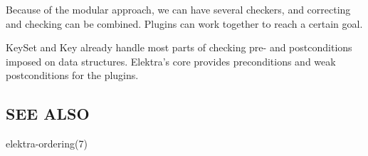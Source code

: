 Because of the modular approach, we can have several checkers, and correcting and checking can be combined. Plugins can work together to reach a certain goal.

{\ttfamily Key\+Set} and {\ttfamily Key} already handle most parts of checking pre-\/ and postconditions imposed on data structures. Elektra's core provides preconditions and weak postconditions for the plugins.

\subsection*{S\+E\+E A\+L\+S\+O}


\begin{DoxyItemize}
\item elektra-\/ordering(7) 
\end{DoxyItemize}